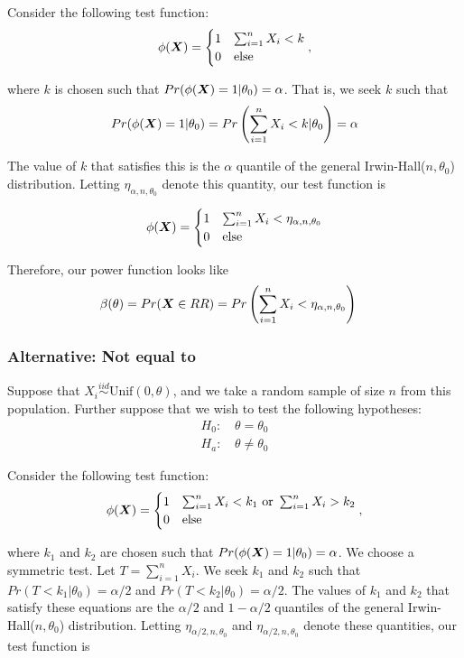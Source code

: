 \documentclass[]{article}
\newcommand{\bfX}{\mbox{\boldmath $X$}}
\begin{document}
Consider the following test function:
\[
\phi(\bfX) = \begin{cases}
1 & \sum_{i=1}^n X_i < k \\
0 & \text{else}
\end{cases},
\]

where $k$ is chosen such that $Pr(\phi(\bfX) = 1|\theta_0) = \alpha$. That is, we seek $k$ such that
\[
Pr(\phi(\bfX) = 1|\theta_0) = Pr\left(\sum_{i=1}^n X_i < k |\theta_0\right) = \alpha
\]

The value of $k$ that satisfies this is the $\alpha$ quantile of the general Irwin-Hall($n, \theta_0$) distribution. Letting $\eta_{\alpha, n, \theta_0}$ denote this quantity, our test function is

\[
\phi(\bfX) = \begin{cases}
1 & \sum_{i=1}^n X_i < \eta_{\alpha, n, \theta_0}\\
0 & \text{else}
\end{cases}
\]

Therefore, our power function looks like
\[
\begin{split}
\beta(\theta) &= Pr(\bfX \in RR) = Pr\left(\sum_{i=1}^n X_i < \eta_{\alpha, n, \theta_0}\right)
\end{split}
\]


\subsubsection{Alternative: Not equal to}

Suppose that $X_i \stackrel{iid}{\sim} \text{Unif}(0, \theta)$, and we take a random sample of size $n$ from this population. Further suppose that we wish to test the following hypotheses:
\[
\begin{split}
\text{$H_0$: }& \theta = \theta_0 \\
\text{$H_a$: }& \theta \neq \theta_0
\end{split}
\]

Consider the following test function:
\[
\phi(\bfX) = \begin{cases}
1 & \sum_{i=1}^n X_i < k_1 \text{ or } \sum_{i=1}^n X_i > k_2 \\
0 & \text{else}
\end{cases},
\]

where $k_1$ and $k_2$ are chosen such that $Pr(\phi(\bfX) = 1|\theta_0) = \alpha$. We choose a symmetric test. Let $T = \sum_{i=1}^n X_i$. We seek $k_1$ and $k_2$ such that $Pr(T < k_1|\theta_0) = \alpha/2$ and $Pr(T < k_2|\theta_0) = \alpha/2$. The values of $k_1$ and $k_2$ that satisfy these equations are the $\alpha/2$ and $1 - \alpha/2$ quantiles of the general Irwin-Hall($n, \theta_0$) distribution. Letting $\eta_{\alpha/2, n, \theta_0}$ and $\eta_{\alpha/2, n, \theta_0}$ denote these quantities, our test function is
\end{document}
